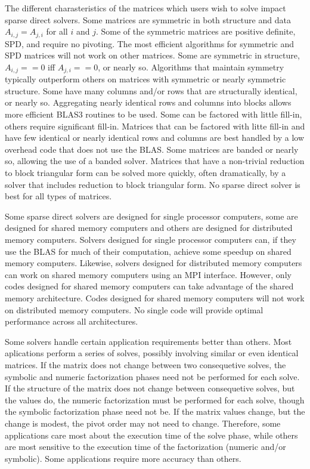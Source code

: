 \documentclass[acmtocl]{acmtrans2m}
\begin{document}
The different charasteristics of the matrices which users wish to
solve impact sparse direct solvers.  Some matrices are symmetric in both
structure and data $A_{i,j} = A_{j,i}$ for all $i$ and $j$.  Some of
the symmetric matrices are positive definite, SPD, and require no
pivoting.  The most efficient algorithms for symmetric and SPD
matrices will not work on other matrices.  Some are symmetric in
structure, $A_{i,j} == 0$ iff $A_{j,i} == 0$, or nearly so.
Algorithms that maintain symmetry typically outperform others on
matrices with symmetric or nearly symmetric structure.  Some have many
columns and/or rows that are structurally identical, or nearly so.
Aggregating nearly identical rows and columns into blocks allows more
efficient BLAS3 routines to be used.  Some can be factored with little
fill-in, others require significant fill-in.  Matrices that can be
factored with litte fill-in and have few identical or nearly identical
rows and columns are best handled by a low overhead code that does not
use the BLAS.  Some matrices are banded or nearly so, allowing the use
of a banded solver.  Matrices that have a non-trivial reduction to
block triangular form can be solved more quickly, often dramatically,
by a solver that includes reduction to block triangular form.  No sparse direct solver is best for all types of matrices.  

Some sparse direct solvers are designed for single processor
computers, some are designed for shared memory computers and others
are designed for distributed memory computers.  Solvers designed for
single processor computers can, if they use the BLAS for much of their
computation, achieve some speedup on shared memory computers.
Likewise, solvers designed for distributed memory computers can work
on shared memory computers using an MPI interface.  However, only
codes designed for shared memory computers can take advantage of the
shared memory architecture.  Codes designed for shared memory
computers will not work on distributed memory computers.  No single
code will provide optimal performance across all architectures.

Some solvers handle certain application requirements better than
others.  Most aplications perform a series of solves, possibly
involving similar or even identical matrices.  If the matrix does not
change between two consequetive solves, the symbolic and numeric
factorization phases need not be performed for each solve.  If the
structure of the matrix does not change between consequetive solves,
but the values do, the numeric factorization must be performed for
each solve, though the symbolic factorization phase need not be.  If
the matrix values change, but the change is modest, the pivot order
may not need to change.  Therefore, some applications care most about
the execution time of the solve phase, while others are most sensitive
to the execution time of the factorization (numeric and/or symbolic).
Some applications require more accuracy than others.
\end{document}
